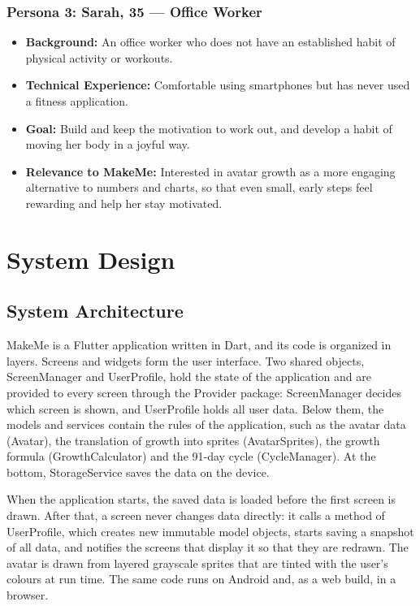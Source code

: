 \documentclass[11pt]{article}
\begin{document}
\subsubsection*{Persona 3: Sarah, 35 --- Office Worker}

\begin{itemize}
    \item \textbf{Background:}
    An office worker who does not have an established habit of physical activity or workouts.
    \item \textbf{Technical Experience:}
    Comfortable using smartphones but has never used a fitness application.
    \item \textbf{Goal:}
    Build and keep the motivation to work out, and develop a habit of moving her body in a joyful way.
    \item \textbf{Relevance to MakeMe:}
      Interested in avatar growth as a more engaging alternative to numbers and charts, so that even small, early steps feel rewarding and help her stay motivated.
\end{itemize}


\section{System Design}
\subsection{System Architecture}
MakeMe is a Flutter application written in Dart, and its code is organized in layers. Screens and widgets form the
user interface. Two shared objects, ScreenManager and UserProfile, hold the state of the application and are provided
to every screen through the Provider package: ScreenManager decides which screen is shown, and UserProfile holds all
user data. Below them, the models and services contain the rules of the application, such as the avatar data (Avatar),
the translation of growth into sprites (AvatarSprites), the growth formula (GrowthCalculator) and the 91-day cycle
(CycleManager). At the bottom, StorageService saves the data on the device.

When the application starts, the saved data is loaded before the first screen is drawn. After that, a screen never
changes data directly: it calls a method of UserProfile, which creates new immutable model objects, starts saving a
snapshot of all data, and notifies the screens that display it so that they are redrawn. The avatar is drawn from
layered grayscale sprites that are tinted with the user's colours at run time. The same code runs on Android and,
as a web build, in a browser.
\end{document}
